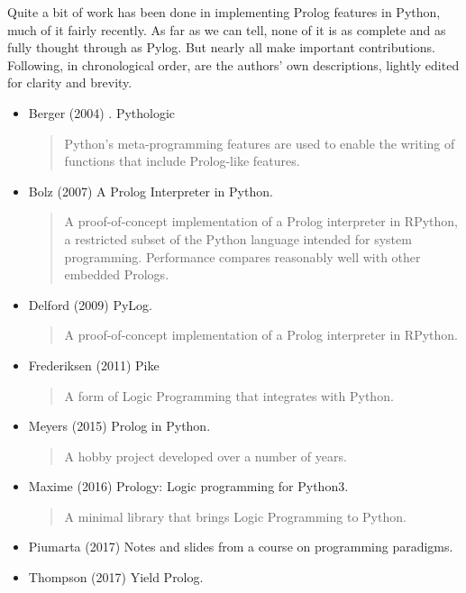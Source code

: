 Quite a bit of work has been done in implementing Prolog features in Python, much of it fairly recently. As far as we can tell, none of it is as complete and as fully thought through as Pylog. But nearly all make important contributions. Following, in chronological order, are the authors' own descriptions, lightly edited for clarity and brevity.

\begin{itemize} %
\item Berger (2004) \cite{berger2004}. Pythologic 
    \begin{quote}
    Python's meta-programming features are used to enable the writing of functions that include Prolog-like features.
    \end{quote}
\item Bolz (2007) \cite{Bolz2007} A Prolog Interpreter in Python.  
    \begin{quote}
    A proof-of-concept implementation of a Prolog interpreter in RPython, a restricted subset of the Python language intended for system programming. Performance compares reasonably well with other embedded Prologs.
    \end{quote}
\item Delford (2009) \cite{Delford2009} PyLog. 
    \begin{quote}
    A proof-of-concept implementation of a Prolog interpreter in RPython.
    \end{quote}
\item Frederiksen (2011) \cite{Frederiksen2011} Pike
    \begin{quote}
    A form of Logic Programming that integrates with Python.
    \end{quote}
\item Meyers (2015) \cite{Meyers2015} Prolog in Python. 
    \begin{quote}A hobby project developed over a number of years.\end{quote}
\item Maxime (2016) \cite{Maxime2016} Prology: Logic programming for Python3.
    \begin{quote}
    A minimal library that brings Logic Programming to Python.
    \end{quote}
\item Piumarta (2017) \cite{Piumarta2017} Notes and slides from a course on programming paradigms.
\item Thompson (2017) \cite{Thompson2017} Yield Prolog.
    \begin{quote} 

\end{quote}
\end{itemize}
